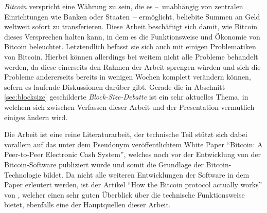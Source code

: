 \emph{Bitcoin} verspricht eine Währung zu sein, die es --~unabhängig von zentralen Einrichtungen wie Banken oder Staaten~-- ermöglicht, beliebite Summen an Geld weltweit sofort zu transferieren.
Diese Arbeit beschäftigt sich damit, wie Bitcoin dieses Versprechen halten kann, in dem es die Funktionsweise und Ökonomie von Bitcoin beleuchtet.
Letztendlich befasst sie sich auch mit einigen Problematiken von Bitcoin.
Hierbei können allerdings bei weitem nicht alle Probleme behandelt werden, da diese einerseits den Rahmen der Arbeit sprengen würden und sich die Probleme andererseits bereits in wenigen Wochen komplett verändern können, sofern es laufende Diskussionen darüber gibt.
Gerade die in Abschnitt \ref{sec:blocksize} geschilderte \emph{Block-Size-Debatte} ist ein sehr aktuelles Thema, in welchem sich zwischen Verfassen dieser Arbeit und der Presentation vermutlich einiges ändern wird.

Die Arbeit ist eine reine Literaturarbeit, der technische Teil stützt sich dabei vorallem auf das unter dem Pseudonym  veröffentlichtem White Paper "`Bitcoin: A Peer-to-Peer Electronic Cash System"', welches noch vor der Entwicklung von der Bitcoin-Software publiziert wurde und somit die Grundlage der Bitcoin-Technologie bildet. \parencite{nakamoto}
Da nicht alle weiteren Entwicklungen der Software in dem Paper erleutert werden, ist der Artikel "`How the Bitcoin protocol actually works"' von , welcher einen sehr guten Überblick über die technische Funktionsweise bietet, ebenfalls eine der Hauptquellen dieser Arbeit. \parencite{nielsen}
